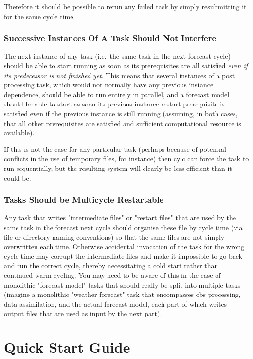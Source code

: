 \documentclass[11pt,a4paper]{article}
\begin{document}
Therefore it should be possible to rerun any failed task by simply
resubmitting it for the same cycle time. 


\subsubsection{Successive Instances Of A Task Should Not Interfere}

The next instance of any task (i.e.\ the same task in the next forecast
cycle) should be able to start running as soon as its prerequisites
are all satisfied {\em even if its predecessor is not finished yet}. This
means that several instances of a post processing task, which would not
normally have any previous instance dependence, should be able to run
entirely in parallel, and a forecast model should be able to start as
soon its previous-instance restart prerequisite is satisfied even if 
the previous instance is still running (assuming, in both cases, that all 
other prerequisites are satisfied and sufficient computational resource
is available). 

If this is not the case for any particular task (perhaps because of
potential conflicts in the use of temporary files, for instance) then
cylc can force the task to run sequentially, but the resulting system
will clearly be less efficient than it could be.


\subsubsection{Tasks Should be Multicycle Restartable}

Any task that writes "intermediate files" or "restart files" that are
used by the same task in the forecast next cycle should organise these
file by cycle time (via file or directory naming conventions) so that
the same files are not simply overwritten each time. Otherwise
accidental invocation of the task for the wrong cycle time may corrupt
the intermediate files and make it impossible to go back and run the
correct cycle, thereby necessitating a cold start rather than continued
warm cycling. You may need to be aware of this in the case of monolithic
"forecast model" tasks that should really be split into multiple tasks
(imagine a monolithic "weather forecast" task that encompasses obs
processing, data assimilation, and the actual forecast model, each
part of which writes output files that are used as input by the next
part). 


\section{Quick Start Guide} 
\label{QuickStartGuide}
\end{document}
